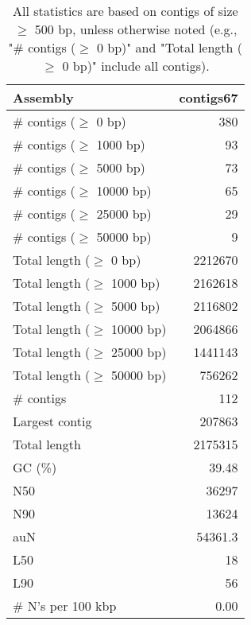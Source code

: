\documentclass[12pt,a4paper]{article}
\begin{document}
\begin{table}[ht]
\begin{center}
\caption{All statistics are based on contigs of size $\geq$ 500 bp, unless otherwise noted (e.g., "\# contigs ($\geq$ 0 bp)" and "Total length ($\geq$ 0 bp)" include all contigs).}
\begin{tabular}{|l*{1}{|r}|}
\hline
Assembly & contigs67 \\ \hline
\# contigs ($\geq$ 0 bp) & 380 \\ \hline
\# contigs ($\geq$ 1000 bp) & 93 \\ \hline
\# contigs ($\geq$ 5000 bp) & 73 \\ \hline
\# contigs ($\geq$ 10000 bp) & 65 \\ \hline
\# contigs ($\geq$ 25000 bp) & 29 \\ \hline
\# contigs ($\geq$ 50000 bp) & 9 \\ \hline
Total length ($\geq$ 0 bp) & 2212670 \\ \hline
Total length ($\geq$ 1000 bp) & 2162618 \\ \hline
Total length ($\geq$ 5000 bp) & 2116802 \\ \hline
Total length ($\geq$ 10000 bp) & 2064866 \\ \hline
Total length ($\geq$ 25000 bp) & 1441143 \\ \hline
Total length ($\geq$ 50000 bp) & 756262 \\ \hline
\# contigs & 112 \\ \hline
Largest contig & 207863 \\ \hline
Total length & 2175315 \\ \hline
GC (\%) & 39.48 \\ \hline
N50 & 36297 \\ \hline
N90 & 13624 \\ \hline
auN & 54361.3 \\ \hline
L50 & 18 \\ \hline
L90 & 56 \\ \hline
\# N's per 100 kbp & 0.00 \\ \hline
\end{tabular}
\end{center}
\end{table}
\end{document}
